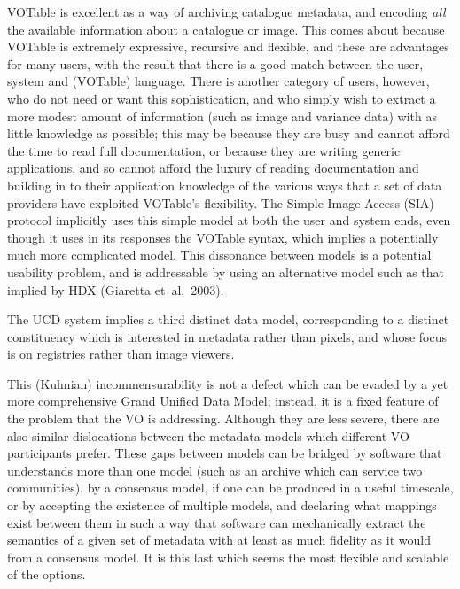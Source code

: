 \documentclass[11pt,twoside]{article}
\begin{document}
VOTable is excellent as a way of archiving catalogue metadata, and
encoding \emph{all} the available information about a catalogue or image.
This comes about because VOTable is extremely expressive, recursive and
flexible, and these are advantages for many users, with the result that
there is a good match between the user, system and (VOTable) language.
There is another category of users, however, who do not need or want this
sophistication, and who simply wish to extract a more modest amount of
information (such as image and variance data) with as little knowledge as
possible; this may be because they are busy and cannot afford the time to
read full documentation, or because they are writing generic applications,
and so cannot afford the luxury of reading documentation and building
in to their application knowledge of the various ways that a set of data
providers have exploited VOTable's flexibility.  The Simple Image Access
(SIA) protocol implicitly uses this simple model at both the user and
system ends, even though it uses in its responses the VOTable syntax,
which implies a potentially much more complicated model.  This
dissonance between models is a potential usability problem, and is
addressable by using an alternative model such as that implied by HDX
(Giaretta et~al.\ 2003).

The UCD system implies a third distinct data model, corresponding to a
distinct constituency which is interested in metadata rather than
pixels, and whose focus is on registries rather than image viewers.

This (Kuhnian) incommensurability is not a defect which can be evaded
by a yet more comprehensive Grand Unified Data Model; instead, it
is a fixed feature of the problem that the VO is addressing.  Although
they are less severe, there are also similar dislocations between the
metadata models which different VO participants prefer.  These gaps
between models can be bridged by software that understands more than
one model (such as an archive which can service two communities), by a
consensus model, if one can be produced in a useful timescale, or
by accepting the existence of multiple models, and declaring what
mappings exist between them in such a way that software can
mechanically extract the semantics of a given set of metadata with at
least as much fidelity as it would from a consensus model.  It is this
last which seems the most flexible and scalable of the options.
\end{document}

